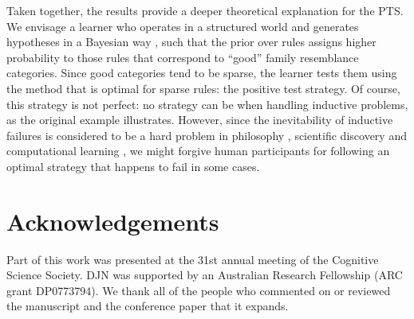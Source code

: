 \documentclass{apa}
\begin{document}
Taken together, the results provide a deeper theoretical explanation for the PTS. We envisage a learner who operates in a structured world and generates hypotheses in a Bayesian way \cite{gettysfisher79}, such that the prior over rules assigns higher probability to those rules that correspond to ``good'' family resemblance categories. Since good categories tend to be sparse, the learner tests them using the method that is optimal for sparse rules: the positive test strategy. Of course, this strategy is not perfect: no strategy can be when handling inductive problems, as the original  example illustrates. However, since the inevitability of inductive failures is considered to be a hard problem in philosophy \cite{hume1739,Goodman1955,goodman72}, scientific discovery \cite{feyerabend75} and computational learning \cite{Wolpert1997}, we might forgive human participants for following an optimal strategy that happens to fail in some cases.


\section{Acknowledgements}

Part of this work was presented at the 31st annual meeting of the Cognitive Science Society. DJN was supported by an Australian Research Fellowship (ARC grant DP0773794). We thank all of the people who commented on or reviewed the manuscript and the conference paper that it expands.


%
\end{document}
